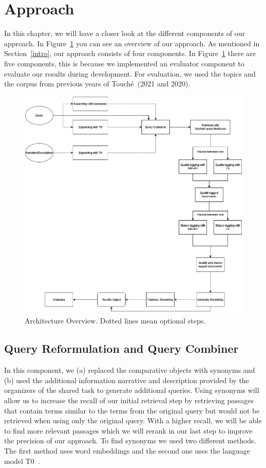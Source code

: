 \section{Approach}\label{approach}

In this chapter, we will have a closer look at the different components of our approach.
In Figure~\ref{figure-pipeline} you can see an overview of our approach.
As mentioned in Section~\ref{intro}, our approach consists of four components.
In Figure~\ref{figure-pipeline} there are five components, this is because we implemented an evaluator component to evaluate our results during development.
For evaluation, we used the topics and the corpus from previous years of Touché~(2021 and 2020).

\begin{figure}[h]
\centering
\includegraphics[scale=0.4]{figures/pipeline}
\caption{Architecture Overview. Dotted lines mean optional steps.}
\label{figure-pipeline}
\end{figure}

\subsection{Query Reformulation and Query Combiner}\label{reformulation}

In this component, we (a) replaced the comparative objects with synonyms and (b) used the additional information narrative and description provided by the organizers of the shared task to generate additional queries.
Using synonyms will allow us to increase the recall of our initial retrieval step by retrieving passages that contain terms similar to the terms from the original query but would not be retrieved when using only the original query.
With a higher recall, we will be able to find more relevant passages which we will rerank in our last step to improve the precision of our approach.
To find synonyms we used two different methods.
The first method uses word embeddings and the second one uses the language model T0~\cite{SanhWRBSACSLRDBXTSSKCNDCJWMSYPBWNRSSFFTBGBWR2021}.

